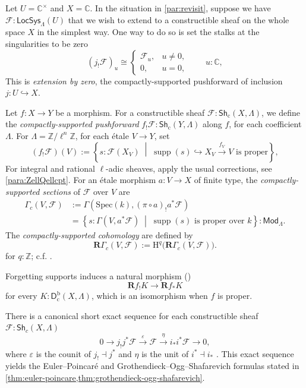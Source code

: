 \documentclass[11pt,letterpaper]{article}
\theoremstyle{numberfirstplain}
\numberwithin{equation}{theorem}
\theoremstyle{numberfirstupright}
\begin{document}
Let $U=\mathbb C^\times$ and $X=\mathbb C$. 
In the situation in \cref{par:revisit}, suppose we have $\mathcal F:\mathsf{LocSys}_{\Lambda}(U)$ that we wish to extend to a constructible sheaf on the whole space $X$ in the simplest way. One way to do so is set the stalks at the singularities to be zero 
$$
(j_{!}\mathcal F)_u\cong
\begin{cases}
  \mathcal F_u, & u\ne 0,\\
  0, & u=0,
\end{cases}
\qquad u:\mathbb C,
$$ 
This is \textit{extension by zero}, the compactly-supported pushforward of inclusion $j:U\hookrightarrow X$. 

\begin{definition}
Let $f:X\to Y$ be a morphism. 
For a constructible sheaf $\mathcal F:\mathsf{Sh}_{\mathrm{c}}(X,\Lambda)$, we define the \textit{compactly-supported pushforward} $f_!\mathcal F:\mathsf{Sh}_{\mathrm{c}}(Y,\Lambda)$ along $f$, for each coefficient $\Lambda$.
For $\Lambda=\mathbb Z/\ell^n\mathbb Z$, for each étale $V\to Y$, set
$$
(f_!\mathcal F)(V):=
\left\{s:\mathcal F(X_V)\;\middle|\;
\operatorname{supp}(s)\hookrightarrow X_V\xrightarrow{\,f_V\,}V
\text{ is proper}\right\},
$$
For integral and rational $\ell$-adic sheaves, apply the usual corrections, see \cref{para:ZellQellcpt}. 
For an étale morphism $a:V\to X$ of finite type, the \textit{compactly-supported sections} of $\mathcal F$ over $V$ are
\[
\begin{aligned}
\Gamma_c(V,\mathcal F)
&:=\Gamma(\mathrm{Spec}(k),(\pi\circ a)_!a^*\mathcal F)\\
&=\left\{s:\Gamma(V,a^*\mathcal F)\;\middle|\;
\operatorname{supp}(s)\text{ is proper over }k\right\}:\mathsf{Mod}_{\Lambda}.
\end{aligned}
\]
The \textit{compactly-supported cohomology} are defined by
\[
\mathbf R\Gamma_c(V,\mathcal F):=\mathrm H^q\bigl(\mathbf R\Gamma_c(V,\mathcal F)\bigr).
\]
for $q:\mathbb Z$; c.f. \cite[Definition~63.12.1, Tag~0GJZ]{StacksProject}.

\end{definition}

Forgetting supports induces a natural morphism (\cite[Remark~63.9.5]{StacksProject})
\[
\mathbf Rf_!K\longrightarrow\mathbf Rf_*K
\]
for every $K:\mathsf D_{\mathrm c}^{\mathrm b}(X,\Lambda)$, which is an isomorphism when $f$ is proper.


There is a canonical short exact sequence for each constructible sheaf $\mathcal F:\mathsf{Sh}_c(X,\Lambda)$ 
\[
0\longrightarrow j_!j^*\mathcal F
\xrightarrow{\varepsilon}\mathcal F
\xrightarrow{\eta} i_*i^*\mathcal F
\longrightarrow0,
\]
where $\varepsilon$ is the counit of $j_!\dashv j^*$ and $\eta$ is the unit of $i^*\dashv i_*$  \cite[Tag~095L]{StacksProject}.
This exact sequence yields the Euler–Poincaré and Grothendieck–Ogg–Shafarevich formulas stated in \cref{thm:euler-poincare,thm:grothendieck-ogg-shafarevich}.
\end{document}
